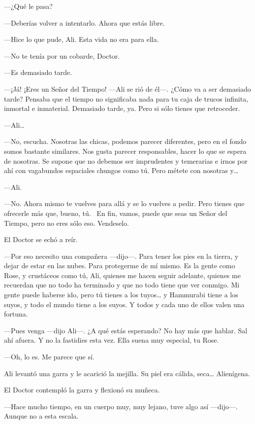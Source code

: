 ---¿Qué le pasa?

---Deberías volver a intentarlo. Ahora que estás libre.

---Hice lo que pude, Ali. Esta vida no era para ella.

---No te tenía por un cobarde, Doctor.

---Es demasiado tarde.

---¡Já! ¡Eres un Señor del Tiempo! ---Ali se rió de él---. ¿Cómo va a
ser demasiado tarde? Pensaba que el tiempo no significaba nada para tu
caja de trucos infinita, inmortal e inmaterial. Demasiado tarde, ya.
Pero si sólo tienes que retroceder.

---Ali\ldots{}

---No, escucha. Nosotras las chicas, podemos parecer diferentes, pero en
el fondo somos bastante similares. Nos gusta parecer responsables, hacer
lo que se espera de nosotras. Se supone que no debemos ser imprudentes y
temerarias e irnos por ahí con vagabundos espaciales chungos como tú.
Pero métete con nosotras y\ldots{}

---Ali.

---No. Ahora mismo te vuelves para allá y se lo vuelves a pedir. Pero
tienes que ofrecerle más que, bueno, tú. ~En fin, vamos, puede que seas
un Señor del Tiempo, pero no eres sólo eso. Vendeselo.

El Doctor se echó a reír.

---Por eso necesito una compañera ---dijo---. Para tener los pies en la
tierra, y dejar de estar en las nubes. Para protegerme de mí mismo. Es
la gente como Rose, y crustáceos como tú, Ali, quienes me hacen seguir
adelante, quienes me recuerdan que no todo ha terminado y que no todo
tiene que ver conmigo. Mi gente puede haberse ido, pero tú tienes a los
tuyos\ldots{} y Hammurabi tiene a los suyos, y todo el mundo tiene a los
suyos. Y todos y cada uno de ellos valen una fortuna.

---Pues venga ---dijo Ali---. ¿A qué estás esperando? No hay más que
hablar. Sal ahí afuera. Y no la fastidies esta vez. Ella suena muy
especial, tu Rose.

---Oh, lo es. Me parece que sí.

Ali levantó una garra y le acarició la mejilla. Su piel era cálida,
seca\ldots{} Alienígena.

El Doctor contempló la garra y flexionó su muñeca.

---Hace mucho tiempo, en un cuerpo muy, muy lejano, tuve algo así
---dijo---. Aunque no a esta escala.

